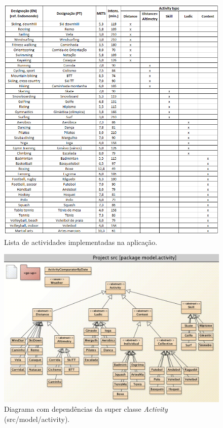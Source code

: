 \documentclass[a4paper,10pt]{report}
\begin{document}
\begin{figure}
\centering
\includegraphics[width=\textwidth]{activitiesTable.png}
\caption{Lista de actividades implementadas na aplicação.}
\label{fig:activityTable}
\end{figure}

\begin{figure}
\centering
\includegraphics[width=\textwidth]{diagramaActivities.png}
\caption{Diagrama com dependências da super classe \emph{Activity} (src/model/activity).}
\label{fig:activityDiagram}
\end{figure}
\end{document}
